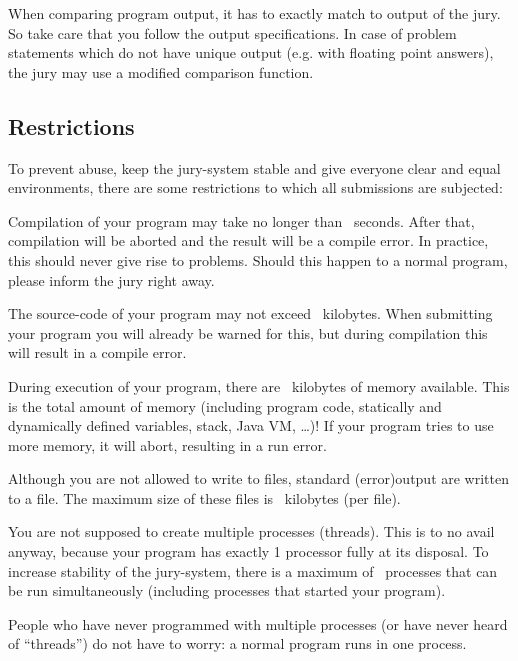 When comparing program output, it has to exactly match to output of
the jury. So take care that you follow the output specifications. In
case of problem statements which do not have unique output (e.g. with
floating point answers), the jury may use a modified comparison
function.

\subsection{Restrictions}\label{runlimits}

To prevent abuse, keep the jury-system stable and give everyone
clear and equal environments, there are some restrictions to which all
submissions are subjected:

\begin{description}
\item[compile time]
Compilation of your program may take no longer than \COMPILETIME\
seconds. After that, compilation will be aborted and the result will
be a compile error. In practice, this should never give rise to
problems. Should this happen to a normal program, please inform the
jury right away.

\item[source size]
The source-code of your program may not exceed \SOURCESIZE\ kilobytes.
When submitting your program you will already be warned for this, but
during compilation this will result in a compile error.

\item[memory]
During execution of your program, there are \MEMLIMIT\ kilobytes of
memory available. This is the total amount of memory (including
program code, statically and dynamically defined variables, stack,
Java VM, \dots)! If your program tries to use more memory, it will
abort, resulting in a run error.

\item[filesize]
Although you are not allowed to write to files, standard (error)output
are written to a file. The maximum size of these files is \FILELIMIT\
kilobytes (per file).

\item[number of processes]
You are not supposed to create multiple processes (threads). This is
to no avail anyway, because your program has exactly 1 processor fully
at its disposal. To increase stability of the jury-system, there is a
maximum of \PROCLIMIT\ processes that can be run simultaneously
(including processes that started your program).

People who have never programmed with multiple processes (or have
never heard of ``threads'') do not have to worry: a normal program
runs in one process.

\end{description}


